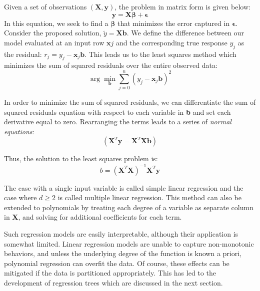 Given a set of observations $(\textbf{X},\textbf{y})$, the problem in matrix form is given below:
%
\begin{equation*}
\textbf{y} = \textbf{X}\boldsymbol\beta + \boldsymbol\epsilon
\end{equation*}
%
In this equation, we seek to find a $\boldsymbol\beta$ that minimizes the error captured in $\boldsymbol\epsilon$.
%
Consider the proposed solution, $\tilde{y} = \textbf{X}\textbf{b}$.
%
We define the difference between our model evaluated at an input row $\textbf{x} j$ and the corresponding true response $y_j$ as the residual: $r_j = y_j - \textbf{x}_j\textbf{b}$.
%
This leads us to the least squares method which minimizes the sum of squared residuals over the entire observed data:
\begin{equation*}
\arg\min_{\textbf{b}} \sum_{j=0}^n(y_j - \textbf{x}_j\textbf{b})^2
\end{equation*}

In order to minimize the sum of squared residuals, we can differentiate the sum of squared residuals equation with respect to each variable in \textbf{b} and set each derivative equal to zero.
%
Rearranging the terms leads to a series of \emph{normal equations}:
\begin{equation*}
(\textbf{X}^T\textbf{y}= \textbf{X}^T\textbf{X}\textbf{b})
\end{equation*}

Thus, the solution to the least squares problem is:
\begin{equation*}
b = (\textbf{X}^T \textbf{X})^{-1} \textbf{X}^T \textbf{y}
\end{equation*}

The case with a single input variable is called simple linear regression and the case where $d\geq 2$ is called multiple linear regression.
%
This method can also be extended to polynomials by treating each degree of a variable as separate column in \textbf{X}, and solving for additional coefficients for each term.

Such regression models are easily interpretable, although their application is somewhat limited.
%
Linear regression models are unable to capture non-monotonic behaviors, and unless the underlying degree of the function is known a priori, polynomial regression can overfit the data.
%
Of course, these effects can be mitigated if the data is partitioned appropriately.
%
This has led to the development of regression trees which are discussed in the next section.

